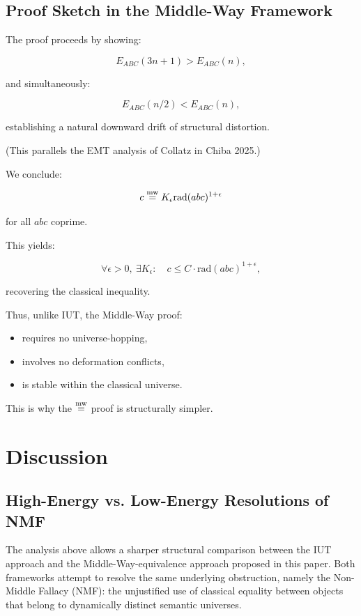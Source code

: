 \documentclass[11pt]{article}
\begin{document}
\subsection{Proof Sketch in the Middle-Way Framework}

The proof proceeds by showing:

\[
E_{ABC}(3n+1) > E_{ABC}(n),
\]

and simultaneously:

\[
E_{ABC}(n/2) < E_{ABC}(n),
\]

establishing a natural downward drift of structural distortion.

(This parallels the EMT analysis of Collatz in Chiba 2025.)

We conclude:

\[
c \mathrel{\overset{\mathrm{mw}}{=}} K_{\epsilon}\mathrm{rad}(abc)^{1+\epsilon}
\]

for all $abc$ coprime.

This yields:

\[
\forall \epsilon > 0,\ \exists K_{\epsilon}:
\quad 
c \le C \cdot \mathrm{rad}(abc)^{1+\epsilon},
\]

recovering the classical inequality.

Thus, unlike IUT, the Middle-Way proof:

\begin{itemize}
\item requires no universe-hopping,
\item involves no deformation conflicts,
\item is stable within the classical universe.
\end{itemize}

This is why the $\mathrel{\overset{\mathrm{mw}}{=}}$ proof is structurally simpler.

\section{Discussion}
\subsection{High-Energy vs. Low-Energy Resolutions of NMF}

The analysis above allows a sharper structural comparison between the
IUT approach and the Middle-Way-equivalence approach proposed in this
paper.  Both frameworks attempt to resolve the same underlying
obstruction, namely the Non-Middle Fallacy (NMF): the unjustified use of
classical equality between objects that belong to dynamically distinct
semantic universes.
\end{document}
